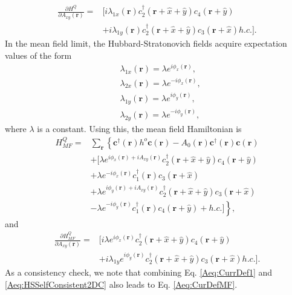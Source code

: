 \documentclass[prb,aps,twocolumn,groupaddress,floatfix]{revtex4-1}
\begin{document}
\begin{equation}
\begin{split}
\frac{\partial H^Q}{\partial{A_{xy}(\bm{r})}} =&  [i \lambda_{1x}(\bm{r})c_2^\dagger(\bm{r}+\hat{x}+\hat{y})c_4(\bm{r}+\hat{y}) \\&+ i \lambda_{1y}(\bm{r})c_2^\dagger(\bm{r}+\hat{x}+\hat{y})c_3(\bm{r}+\hat{x}) h.c.] .
\end{split}\label{Aeq:CurrDef1}
\end{equation}
In the mean field limit, the Hubbard-Stratonovich fields acquire expectation values of the form
\begin{equation}
\begin{split}
&\lambda_{1x}(\bm{r})=  \lambda e^{i\phi_x(\bm{r})},\\
&\lambda_{2x}(\bm{r})=  \lambda e^{-i\phi_x(\bm{r})},\\
&\lambda_{1y}(\bm{r})=  \lambda e^{i\phi_y(\bm{r})},\\
&\lambda_{2y}(\bm{r})=  \lambda e^{-i\phi_y(\bm{r})},
\end{split}\label{Aeq:HSSelfConsistent2DC}
\end{equation}
where $\lambda$ is a constant. Using this, the mean field Hamiltonian is
\begin{equation}
\begin{split}
H^{Q}_{MF} = &\sum_{\bm{r}} \left\{\bm{c}^\dagger(\bm{r}) h^o \bm{c}(\bm{r}) - A_0(\bm{r}) \bm{c}^\dagger(\bm{r}) \bm{c}(\bm{r})\right.\\&+[\lambda e^{i\phi_x(\bm{r}) + i A_{xy}(\bm{r})}c_2^\dagger(\bm{r}+\hat{x}+\hat{y})c_4(\bm{r}+\hat{y})\\& + \lambda e^{-i\phi_x(\bm{r}) } c_1^\dagger(\bm{r})c_3(\bm{r}+\hat{x}) \\&+\lambda e^{i\phi_y(\bm{r}) + i A_{xy}(\bm{r})}c_2^\dagger(\bm{r}+\hat{x}+\hat{y})c_3(\bm{r}+\hat{x})\\ &- \left.\lambda e^{-i\phi_y(\bm{r}) }c_1^\dagger(\bm{r})c_4(\bm{r}+\hat{y}) + h.c.]\right\},
\end{split}\label{Aeq:MFMinimalCoup}
\end{equation}
and 
\begin{equation}
\begin{split}
\frac{\partial H^Q_{MF}}{\partial{A_{xy}(\bm{r})}} =& [ i \lambda e^{i\phi_x(\bm{r})}c_2^\dagger(\bm{r}+\hat{x}+\hat{y})c_4(\bm{r}+\hat{y}) \\&+ i \lambda_{1y} e^{i\phi_y(\bm{r})}c_2^\dagger(\bm{r}+\hat{x}+\hat{y})c_3(\bm{r}+\hat{x}) h.c.].
\end{split}\label{Aeq:CurDefMF}
\end{equation}
As a consistency check, we note that combining Eq. \ref{Aeq:CurrDef1} and \ref{Aeq:HSSelfConsistent2DC} also leads to Eq. \ref{Aeq:CurDefMF}. 
\end{document}
